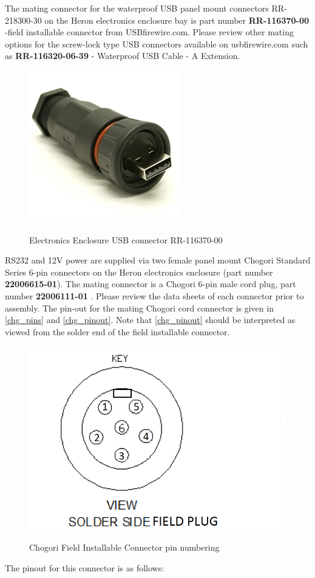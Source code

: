 \documentclass[]{clearpath-latex/clearpath-manual}
\begin{document}
The mating connector for the waterproof USB panel mount connectors RR-218300-30 on the Heron electronics enclosure bay is part number \textbf{RR-116370-00} -field installable connector from USBfirewire.com. Please review other mating options for the screw-lock type USB connectors available on usbfirewire.com such as \textbf{RR-116320-06-39} - Waterproof USB Cable - A Extension.

\begin{figure}[h]
  \centering
  \includegraphics[width=0.25\linewidth]{RR-116370-00.jpg}
  \label{h_usb0}
  \caption{Electronics Enclosure USB connector RR-116370-00}
\end{figure}

RS232 and 12V power are supplied via two female panel mount Chogori Standard Series 6-pin connectors on the Heron electronics enclosure (part number \textbf{22006615-01}).  The mating connector is a Chogori 6-pin male cord plug, part number \textbf{22006111-01} . Please review the data sheets of each connector prior to assembly. The pin-out for the mating Chogori cord connector is given in \autoref{chg_pins} and \autoref{chg_pinout}. Note that \autoref{chg_pinout} should be interpreted as viewed from the solder end of the field installable connector. 

\begin{figure}[h]
  \centering
  \includegraphics[width=0.5\linewidth]{graphics/h-field_conn_pins.png}
  \label{chg_pins}
  \caption{Chogori Field Installable Connector pin numbering }
\end{figure}


The pinout for this connector is as follows:
\end{document}
